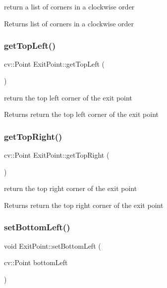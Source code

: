 return a list of corners in a clockwise order \begin{DoxyReturn}{Returns}
list of corners in a clockwise order 
\end{DoxyReturn}
\mbox{\label{class_exit_point_ad373de21603871832e10568631ef3cda}} 
\subsubsection{\texorpdfstring{get\+Top\+Left()}{getTopLeft()}}
{\footnotesize\ttfamily cv\+::\+Point Exit\+Point\+::get\+Top\+Left (\begin{DoxyParamCaption}{ }\end{DoxyParamCaption})}

return the top left corner of the exit point \begin{DoxyReturn}{Returns}
return the top left corner of the exit point 
\end{DoxyReturn}
\mbox{\label{class_exit_point_a448716aa575ba751f72ab0f437b6a138}} 
\subsubsection{\texorpdfstring{get\+Top\+Right()}{getTopRight()}}
{\footnotesize\ttfamily cv\+::\+Point Exit\+Point\+::get\+Top\+Right (\begin{DoxyParamCaption}{ }\end{DoxyParamCaption})}

return the top right corner of the exit point \begin{DoxyReturn}{Returns}
return the top right corner of the exit point 
\end{DoxyReturn}
\mbox{\label{class_exit_point_a22bf3a433b3567d36463699e16aaa86b}} 
\subsubsection{\texorpdfstring{set\+Bottom\+Left()}{setBottomLeft()}}
{\footnotesize\ttfamily void Exit\+Point\+::set\+Bottom\+Left (\begin{DoxyParamCaption}\item[{cv\+::\+Point}]{bottom\+Left }\end{DoxyParamCaption})}

